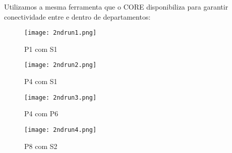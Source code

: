 \documentclass{llncs}
\begin{document}
Utilizamos a mesma ferramenta que o CORE disponibiliza para garantir conectividade entre e dentro de departamentos:

\begin{figure}[!ht]
	\centering
	\begin{minipage}{0.40\textwidth}
		\centering
		\texttt{[image: 2ndrun1.png]}
		\caption{P1 com S1}
	\end{minipage}\hfill
	\begin{minipage}{0.40\textwidth}
		\centering
		\texttt{[image: 2ndrun2.png]}
		\caption{P4 com S1}
	\end{minipage}
\end{figure}
\vspace{-4.9em}
\begin{figure}[!ht]
	\centering
	\begin{minipage}{0.40\textwidth}
		\centering
		\texttt{[image: 2ndrun3.png]}
		\caption{P4 com P6}
	\end{minipage}\hfill
	\begin{minipage}{0.40\textwidth}
		\centering
		\texttt{[image: 2ndrun4.png]}
		\caption{P8 com S2}
	\end{minipage}
\end{figure}
\end{document}
